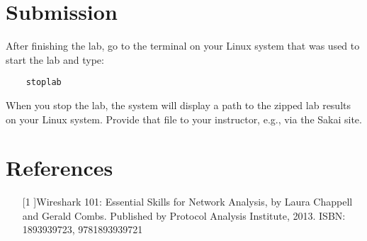 \section{Submission}
After finishing the lab, go to the terminal on your Linux system that was used to start the lab and type:
\begin{verbatim}
    stoplab 
\end{verbatim}
When you stop the lab, the system will display a path to the zipped lab results on your Linux system.  Provide that file to 
your instructor, e.g., via the Sakai site.

\section{References}
\begin{enumerate}
\item[[1]]Wireshark 101: Essential Skills for Network Analysis,
by Laura Chappell and Gerald Combs.
Published by Protocol Analysis Institute, 2013.
ISBN: 1893939723, 9781893939721
\end{enumerate}

